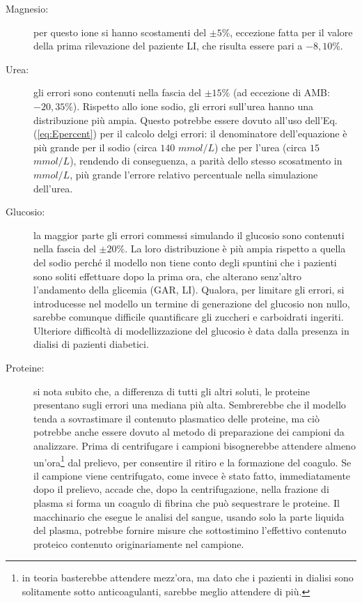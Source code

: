 \begin{description}
	\item[Magnesio:] per questo ione si hanno scostamenti del $\pm 5\%$, eccezione fatta per il valore della prima rilevazione del paziente LI, che risulta essere pari a $-8,10\%$.
	\item[Urea:] gli errori sono contenuti nella fascia del $\pm 15\%$ (ad eccezione di AMB: $-20,35\%$). Rispetto allo ione sodio, gli errori sull'urea hanno una distribuzione più ampia. Questo potrebbe essere dovuto all'uso dell'Eq.(\ref{eq:Epercent}) per il calcolo delgi errori: il denominatore dell'equazione è più grande per il sodio (circa $140$ $mmol/L$) che per l'urea (circa $15$ $mmol/L$), rendendo di conseguenza, a parità dello stesso scosatmento in $mmol/L$, più grande l'errore relativo percentuale nella simulazione dell'urea.
	\item[Glucosio:] la maggior parte gli errori commessi simulando il glucosio sono contenuti nella fascia del $\pm 20\%$. La loro distribuzione è più ampia rispetto a quella del sodio perché il modello non tiene conto degli spuntini che i pazienti sono soliti effettuare dopo la prima ora, che alterano senz'altro l'andamento della glicemia (GAR, LI). Qualora, per limitare gli errori, si introducesse nel modello un termine di generazione del glucosio non nullo, sarebbe comunque difficile quantificare gli zuccheri e carboidrati ingeriti. Ulteriore difficoltà di modellizzazione del glucosio è data dalla presenza in dialisi di pazienti diabetici.
	\item[Proteine:] si nota subito che, a differenza di tutti gli altri soluti, le proteine presentano sugli errori una mediana più alta. Sembrerebbe che il modello tenda a sovrastimare il contenuto plasmatico delle proteine, ma ciò potrebbe anche essere dovuto al metodo di preparazione dei campioni da analizzare. Prima di centrifugare i campioni bisognerebbe attendere almeno un'ora\footnote{in teoria basterebbe attendere mezz'ora, ma dato che i pazienti in dialisi sono solitamente sotto anticoagulanti, sarebbe meglio attendere di più.} dal prelievo, per consentire il ritiro e la formazione del coagulo. Se il campione viene centrifugato, come invece è stato fatto, immediatamente dopo il prelievo, accade che, dopo la centrifugazione, nella frazione di plasma si forma un coagulo di fibrina che può sequestrare le proteine. Il macchinario che esegue le analisi del sangue, usando solo la parte liquida del plasma, potrebbe fornire misure che sottostimino l'effettivo contenuto proteico contenuto originariamente nel campione.
\end{description}

